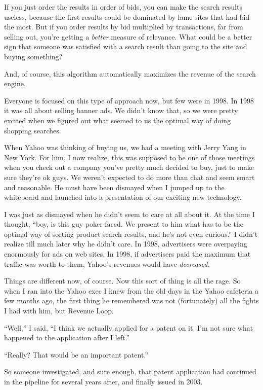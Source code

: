 \documentclass[12pt]{book}
\begin{document}
If you just order the results in order of bids, you can make the search
results useless, because the first results could be dominated by lame
sites that had bid the most. But if you order results by bid multiplied
by transactions, far from selling out, you're getting a \emph{better}
measure of relevance. What could be a better sign that someone was
satisfied with a search result than going to the site and buying
something?

And, of course, this algorithm automatically maximizes the revenue of
the search engine.

Everyone is focused on this type of approach now, but few were in 1998.
In 1998 it was all about selling banner ads. We didn't know that, so we
were pretty excited when we figured out what seemed to us the optimal
way of doing shopping searches.

When Yahoo was thinking of buying us, we had a meeting with Jerry Yang
in New York. For him, I now realize, this was supposed to be one of
those meetings when you check out a company you've pretty much decided
to buy, just to make sure they're ok guys. We weren't expected to do
more than chat and seem smart and reasonable. He must have been dismayed
when I jumped up to the whiteboard and launched into a presentation of
our exciting new technology.

I was just as dismayed when he didn't seem to care at all about it. At
the time I thought, ``boy, is this guy poker-faced. We present to him
what has to be the optimal way of sorting product search results, and
he's not even curious.'' I didn't realize till much later why he didn't
care. In 1998, advertisers were overpaying enormously for ads on web
sites. In 1998, if advertisers paid the maximum that traffic was worth
to them, Yahoo's revenues would have \emph{decreased.}

Things are different now, of course. Now this sort of thing is all the
rage. So when I ran into the Yahoo exec I knew from the old days in the
Yahoo cafeteria a few months ago, the first thing he remembered was not
(fortunately) all the fights I had with him, but Revenue Loop.

``Well,'' I said, ``I think we actually applied for a patent on it. I'm
not sure what happened to the application after I left.''

``Really? That would be an important patent.''

So someone investigated, and sure enough, that patent application had
continued in the pipeline for several years after, and finally issued in
2003.
\end{document}
